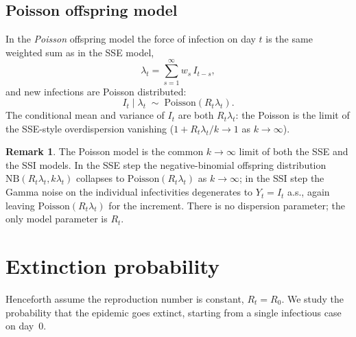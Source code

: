 \documentclass{article}
\theoremstyle{definition}
\newtheorem*{remark}{Remark}
\begin{document}
\subsection{Poisson offspring model}
\label{sec:poisson}

In the \emph{Poisson} offspring model the force of infection on day $t$ is
the same weighted sum as in the SSE model,
\begin{equation}
  \lambda_t = \sum_{s=1}^{\infty} w_s\, I_{t-s},
\end{equation}
and new infections are Poisson distributed:
\begin{equation}
  I_t \mid \lambda_t \;\sim\;
  \mathrm{Poisson}\!\left(R_t \lambda_t\right).
\end{equation}
The conditional mean and variance of $I_t$ are both $R_t \lambda_t$:
the Poisson is the limit of the SSE-style overdispersion vanishing
($1 + R_t \lambda_t / k \to 1$ as $k \to \infty$).

\begin{remark}
  The Poisson model is the common $k \to \infty$ limit of both the SSE
  and the SSI models.  In the SSE step the negative-binomial offspring
  distribution $\mathrm{NB}(R_t \lambda_t, k\lambda_t)$ collapses to
  $\mathrm{Poisson}(R_t \lambda_t)$ as $k \to \infty$; in the SSI step
  the Gamma noise on the individual infectivities degenerates to
  $Y_t = I_t$ a.s., again leaving $\mathrm{Poisson}(R_t \lambda_t)$ for
  the increment.  There is no dispersion parameter; the only model
  parameter is $R_t$.
\end{remark}

\section{Extinction probability}
\label{sec:extinction}

Henceforth assume the reproduction number is constant, $R_t = R_0$.  We
study the probability that the epidemic goes extinct, starting from a single
infectious case on day~0.
\end{document}
